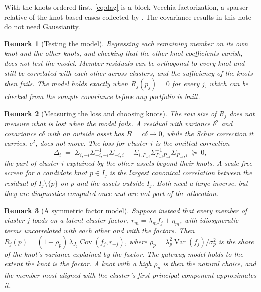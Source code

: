 \documentclass[11pt]{article}
\DeclareMathOperator{\Cov}{Cov}
\DeclareMathOperator{\Var}{Var}
\newtheorem{remark}{Remark}
\begin{document}
With the knots ordered first, \eqref{eq:dag} is a block-Vecchia
factorization, a sparser relative of the knot-based cases collected by
\textcite{katzfuss2021}. The covariance results in this note do not need
Gaussianity.

\begin{remark}[Testing the model]
Regressing each remaining member on its own knot and the other knots, and
checking that the other-knot coefficients vanish, does not test the model.
Member residuals can be orthogonal to every knot and still be correlated
with each other across clusters, and the sufficiency of the knots then
fails. The model holds exactly when $R_j(p_j)=0$ for every $j$, which can
be checked from the sample covariance before any portfolio is built.
\end{remark}

\begin{remark}[Measuring the loss and choosing knots]
The raw size of $R_j$ does not measure what is lost when the model fails. A
residual with variance $\delta^2$ and covariance $c\delta$ with an outside
asset has $R=c\delta\to0$, while the Schur correction it carries, $c^2$,
does not move. The loss for cluster $i$ is the omitted correction
\begin{equation}
  \Delta_i \;=\; \Sigma_{i,-i}\Sigma_{-i,-i}^{-1}\Sigma_{-i,i}
   -\Sigma_{i,P_{-i}}\Sigma_{P_{-i}P_{-i}}^{-1}\Sigma_{P_{-i},i}
  \;\succeq\; 0,
  \label{eq:loss}
\end{equation}
the part of cluster $i$ explained by the other assets beyond their knots.
A scale-free screen for a candidate knot $p\in I_j$ is the largest canonical
correlation between the residual of $I_j\setminus\{p\}$ on $p$ and the
assets outside $I_j$. Both need a large inverse, but they are diagnostics
computed once and are not part of the allocation.
\end{remark}

\begin{remark}[A symmetric factor model]
Suppose instead that every member of cluster $j$ loads on a latent cluster
factor, $r_m=\lambda_m f_j+\eta_m$, with idiosyncratic terms uncorrelated
with each other and with the factors. Then
$R_j(p)=(1-\rho_p)\,\lambda_{J_j}\Cov(f_j,r_{-j})$, where
$\rho_p=\lambda_p^2\Var(f_j)/\sigma_p^2$ is the share of the knot's variance
explained by the factor. The gateway model holds to the extent the knot is
the factor. A knot with a high $\rho_p$ is then the natural choice, and the
member most aligned with the cluster's first principal component
approximates it.
\end{remark}
\end{document}
